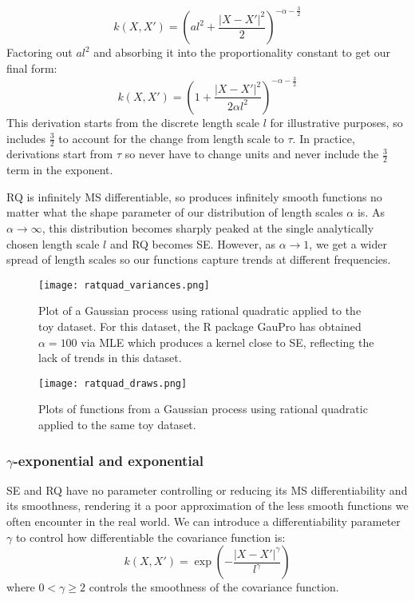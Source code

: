 \begin{equation*}
    k(X,X') = \left( al^2 + \frac{|X - X'|^2}{2} \right)^{-\alpha - \frac{3}{2}}
\end{equation*}
Factoring out $al^2$ and absorbing it into the proportionality constant to get our final form:
\begin{equation*}
    k(X,X') = \left( 1 + \frac{|X - X'|^2}{2\alpha l^2} \right)^{-\alpha - \frac{3}{2}}
\end{equation*}
This derivation starts from the discrete length scale $l$ for illustrative purposes, so includes $\frac{3}{2}$ to account for the change from length scale to $\tau$. In practice, derivations start from $\tau$ so never have to change units and never include the $\frac{3}{2}$ term in the exponent.

RQ is infinitely MS differentiable, so produces infinitely smooth functions no matter what the shape parameter of our distribution of length scales $\alpha$ is. As $\alpha \to \infty$, this distribution becomes sharply peaked at the single analytically chosen length scale $l$ and RQ becomes SE. However, as $\alpha \to 1$, we get a wider spread of length scales so our functions capture trends at different frequencies. 

\begin{figure}[H]
    \texttt{[image: ratquad\_variances.png]}
    \caption{
        Plot of a Gaussian process using rational quadratic applied to the toy dataset. For this dataset, the R package GauPro \cite{gaopro} has obtained $\alpha = 100$ via MLE which produces a kernel close to SE, reflecting the lack of trends in this dataset. \\
    }
\end{figure}

\begin{figure}[H]
    \texttt{[image: ratquad\_draws.png]} \\
    \caption{
        Plots of functions from a Gaussian process using rational quadratic applied to the same toy dataset. \\
    }
\end{figure}

\subsubsection{$\gamma$-exponential and exponential}
SE and RQ have no parameter controlling or reducing its MS differentiability and its smoothness, rendering it a poor approximation of the less smooth functions we often encounter in the real world. We can introduce a differentiability parameter $\gamma$ to control how differentiable the covariance function is:
\begin{equation*}
    k(X,X') = \exp \left(-\frac{|X - X'|^{\gamma}}{l^{\gamma}} \right)
\end{equation*}
where $0 < \gamma \geq 2$ controls the smoothness of the covariance function. 

